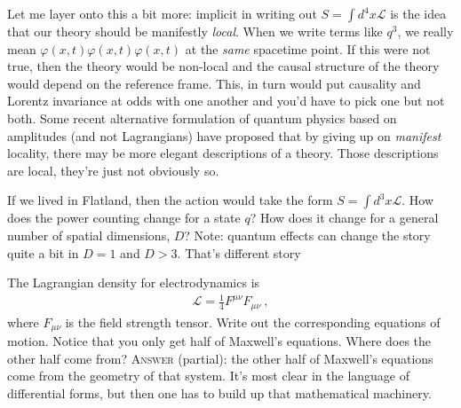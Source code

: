 Let me layer onto this a bit more: implicit in writing out $S=\int d^4x\mathcal L$ is the idea that our theory should be manifestly \emph{local}. When we write terms like $q^3$, we really mean $\varphi(x,t)\varphi(x,t)\varphi(x,t)$ at the \emph{same} spacetime point. If this were not true, then the theory would be non-local and the causal structure of the theory would depend on the reference frame. This, in turn would put causality and Lorentz invariance at odds with one another and you'd have to pick one but not both. Some recent alternative formulation of quantum physics based on amplitudes (and not Lagrangians) have proposed that by giving up on \emph{manifest} locality, there may be more elegant descriptions of a theory. Those descriptions are local, they're just not obviously so.

\begin{exercise}
If we lived in Flatland, then the action would take the form $S = \int d^3x \mathcal L$. How does the power counting change for a state $q$? How does it change for a general number of spatial dimensions, $D$? Note: quantum effects can change the story quite a bit in $D=1$ and $D>3$. That's different story
\end{exercise}

\begin{exercise}
The Lagrangian density for electrodynamics is
\begin{align}
	\mathcal L = \frac{1}{4}F^{\mu\nu}F_{\mu\nu} \ ,
\end{align}
where $F_{\mu\nu}$ is the field strength tensor. Write out the corresponding equations of motion. Notice that you only get half of Maxwell's equations. Where does the other half come from? \textsc{Answer} (partial): the other half of Maxwell's equations come from the geometry of that system. It's most clear in the language of differential forms, but then one has to build up that mathematical machinery.
\end{exercise}


